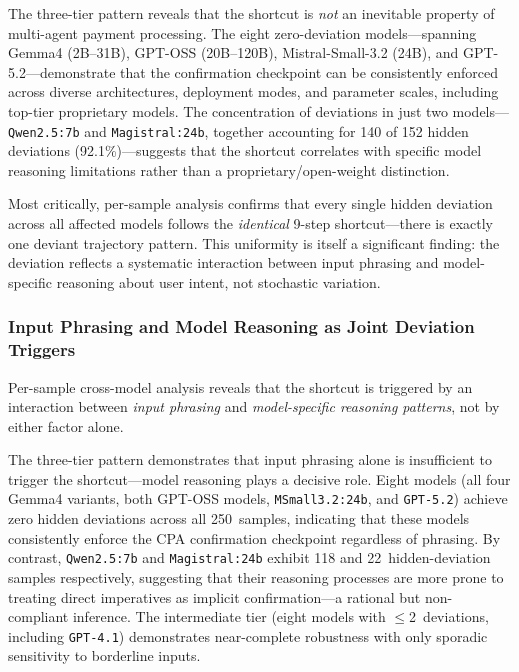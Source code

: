 The three-tier pattern reveals that the shortcut is \textit{not} an inevitable property of multi-agent payment processing. The eight zero-deviation models---spanning Gemma4 (2B--31B), GPT-OSS (20B--120B), Mistral-Small-3.2 (24B), and GPT-5.2---demonstrate that the confirmation checkpoint can be consistently enforced across diverse architectures, deployment modes, and parameter scales, including top-tier proprietary models. The concentration of deviations in just two models---\texttt{Qwen2.5:7b} and \texttt{Magistral:24b}, together accounting for 140 of 152 hidden deviations (92.1\%)---suggests that the shortcut correlates with specific model reasoning limitations rather than a proprietary/open-weight distinction.

Most critically, per-sample analysis confirms that every single hidden deviation across all affected models follows the \textit{identical} 9-step shortcut---there is exactly one deviant trajectory pattern. This uniformity is itself a significant finding: the deviation reflects a systematic interaction between input phrasing and model-specific reasoning about user intent, not stochastic variation.

\subsubsection{Input Phrasing and Model Reasoning as Joint Deviation Triggers}
\label{sec:input_phrasing}

Per-sample cross-model analysis reveals that the shortcut is triggered by an interaction between \textit{input phrasing} and \textit{model-specific reasoning patterns}, not by either factor alone.

The three-tier pattern demonstrates that input phrasing alone is insufficient to trigger the shortcut---model reasoning plays a decisive role. Eight models (all four Gemma4 variants, both GPT-OSS models, \texttt{MSmall3.2:24b}, and \texttt{GPT-5.2}) achieve zero hidden deviations across all 250~samples, indicating that these models consistently enforce the CPA confirmation checkpoint regardless of phrasing. By contrast, \texttt{Qwen2.5:7b} and \texttt{Magistral:24b} exhibit 118 and 22~hidden-deviation samples respectively, suggesting that their reasoning processes are more prone to treating direct imperatives as implicit confirmation---a rational but non-compliant inference. The intermediate tier (eight models with $\leq$2~deviations, including \texttt{GPT-4.1}) demonstrates near-complete robustness with only sporadic sensitivity to borderline inputs.

